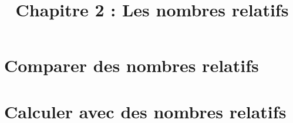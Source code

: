 \title{\vspace{-2em}Chapitre 2 : Les nombres relatifs\vspace{-3em}}%
\date{ }
\maketitle


\section{Comparer des nombres relatifs}



\section{Calculer avec des nombres relatifs}


